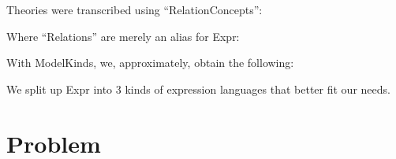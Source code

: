 \originalFewExprSmartConstructorsHaskell

Theories were transcribed using ``RelationConcepts'':

\originalRelationConcept

Where ``Relations'' are merely an alias for Expr:

\originalRelation{}

\theoriesWithoutModelKinds

With ModelKinds, we, approximately, obtain the following:

\theoriesWithModelKinds

We split up Expr into 3 kinds of expression languages that better fit our needs.

\section{Problem}

